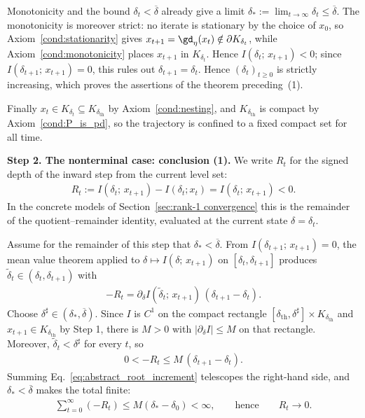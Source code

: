 \documentclass{article}
\begin{document}
Monotonicity and the bound $\delta_t<\overline\delta$ already give a limit
$\delta_\ast:=\lim_{t\to\infty}\delta_t\le\overline\delta$. The monotonicity is
moreover strict: no iterate is stationary by the choice of $x_0$, so
Axiom~\ref{cond:stationarity} gives
$x_{t+1}=\gd_\eta(x_t)\notin\partial K_{\delta_t}$, while
Axiom~\ref{cond:monotonicity} places $x_{t+1}$ in $K_{\delta_t}$. Hence
$I(\delta_t;\,x_{t+1})<0$; since
$I(\delta_{t+1};\,x_{t+1})=0$, this rules out $\delta_{t+1}=\delta_t$. Hence
$(\delta_t)_{t\ge0}$ is strictly increasing, which proves the assertions of the
theorem preceding~(1).

Finally $x_t\in K_{\delta_t}\subseteq K_{\delta_{\mathrm{th}}}$ by
Axiom~\ref{cond:nesting}, and $K_{\delta_{\mathrm{th}}}$ is compact by
Axiom~\ref{cond:P_is_pd}, so the trajectory is confined to a fixed compact set
for all time.

\textbf{Step 2. The nonterminal case: conclusion (1).}
We write $R_t$ for the signed depth of the inward step from the current level
set:
\begin{align}
    R_t := I(\delta_t;\,x_{t+1}) - I(\delta_t;x_t) =  I(\delta_t;\,x_{t+1}) < 0.
    \label{eq:abstract_strict_inward}
\end{align}
In the concrete models of Section~\ref{sec:rank-1 convergence} this is the
remainder of the quotient--remainder identity, evaluated at the current state
$\delta=\delta_t$.

Assume for the remainder of this step that $\delta_\ast<\overline\delta$. From
$I(\delta_{t+1};\,x_{t+1})=0$, the mean value theorem applied to
$\delta\mapsto I(\delta;\,x_{t+1})$ on $[\delta_t,\delta_{t+1}]$ produces
$\widetilde\delta_t\in(\delta_t,\delta_{t+1})$ with
\begin{align}
    -R_t=\partial_\delta I(\widetilde\delta_t;\,x_{t+1})
    \, (\delta_{t+1}-\delta_t).
\end{align}
Choose $\delta^\sharp\in(\delta_\ast,\overline\delta)$. Since $I$ is $C^1$ on
the compact rectangle
$[\delta_{\mathrm{th}},\delta^\sharp]\times K_{\delta_{\mathrm{th}}}$ and
$x_{t+1}\in K_{\delta_{\mathrm{th}}}$ by Step 1, there is $M>0$ with
$|\partial_\delta I|\le M$ on that rectangle. Moreover,
$\widetilde\delta_t<\delta^\sharp$ for every $t$, so
\begin{align}
        0<-R_t\le M\,(\delta_{t+1}-\delta_t).
    \label{eq:abstract_root_increment}
\end{align}
Summing Eq.~\eqref{eq:abstract_root_increment} telescopes the right-hand side,
and $\delta_\ast<\overline\delta$ makes the total finite:
\begin{align}
        \sum_{t=0}^\infty (-R_t)\le M(\delta_\ast-\delta_0)<\infty,
    \qquad\text{hence}\qquad
    R_t\to 0 .
    \label{eq:abstract_R_to_zero}
\end{align}
\end{document}
